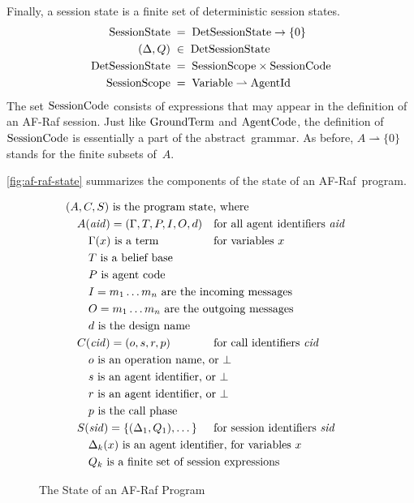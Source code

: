 \documentclass[a4paper,12pt,oneside,fleqn]{book} %
\newcommand{\pmap}{\rightharpoonup}
\begin{document}
Finally, a session state is a finite set of deterministic session states.
\begin{align}
{\rm SessionState} &\;=\; {\rm DetSessionState}\to\{0\}
\\
(\Delta,Q) &\;\in\;{\rm DetSessionState}
\\
{\rm DetSessionState} &\;=\;
  {\rm SessionScope}\times{\rm SessionCode}
\\
{\rm SessionScope} &\;=\; {\rm Variable}\pmap{\rm AgentId}
\end{align}
The set ${\rm SessionCode}$ consists of expressions that may appear in the
definition of an AF-Raf session. Just like ${\rm GroundTerm}$ and ${\rm
AgentCode}$, the definition of ${\rm SessionCode}$ is essentially a part of
the abstract~grammar.  As before, $A\pmap\{0\}$ stands for the finite
subsets of~$A$.

\autoref{fig:af-raf-state} summarizes the components of the state of an
AF-Raf~program.

\begin{figure}
\def\.#1{\text{\rlap{ #1}}}
\begin{align*}
&(A, C, S)\.{is the program state, where} \\
&\quad A({\it aid})=(\Gamma, T, P, I, O, d)
  &&\text{for all agent identifiers~$\it aid$} \\
&\quad\quad \text{$\Gamma(x)$ is a term} && \text{for variables~$x$} \\
&\quad\quad T\.{is a belief base} \\
&\quad\quad P\.{is agent code} \\
&\quad\quad I=m_1\ldots m_n\.{are the incoming messages} \\
&\quad\quad O=m_1\ldots m_n\.{are the outgoing messages} \\
&\quad\quad d\.{is the design name} \\
&\quad C({\it cid})=(o,s,r,p)
  &&\text{for call identifiers~$\it cid$} \\
&\quad\quad o\.{is an operation name, or $\bot$} \\
&\quad\quad s\.{is an agent identifier, or $\bot$} \\
&\quad\quad r\.{is an agent identifier, or $\bot$} \\
&\quad\quad p\.{is the call phase} \\
&\quad S({\it sid})=\{(\Delta_1,Q_1),\ldots\,\}
  &&\text{for session identifiers~$\it sid$} \\
&\quad\quad \Delta_k(x)\.{is an agent identifier, for variables~$x$} \\
&\quad\quad Q_k\.{is a finite set of session expressions}
\end{align*}
\caption{The State of an AF-Raf Program}
\label{fig:af-raf-state}
\end{figure}
\end{document}
